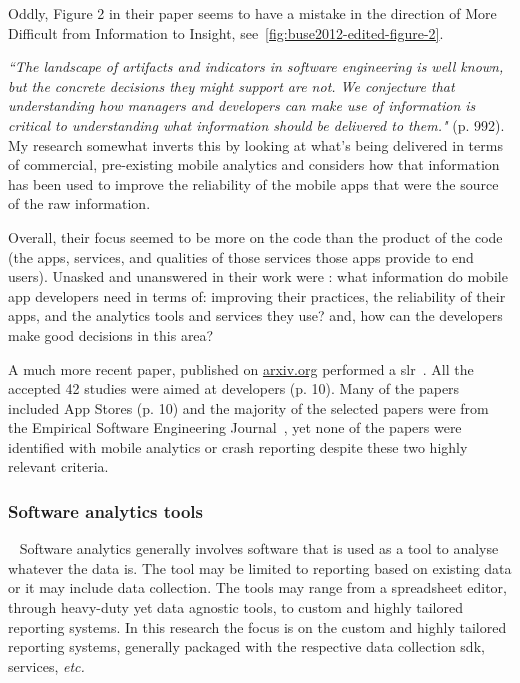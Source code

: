 Oddly, Figure 2 in their paper seems to have a mistake in the direction of More Difficult from Information to Insight, see~\ref{fig:buse2012-edited-figure-2}.

\emph{``The landscape of artifacts and indicators in software engineering is well known, but the concrete decisions they might support are not. We conjecture that understanding how managers and developers can make use of information is critical to understanding what information should be delivered to them."} (p. 992). 
My research somewhat inverts this by looking at what's being delivered in terms of commercial, pre-existing mobile analytics and considers how that information has been used to improve the reliability of the mobile apps that were the source of the raw information.

Overall, their focus seemed to be more on the code than the product of the code (the apps, services, and qualities of those services those apps provide to end users). Unasked and unanswered in their work were : what information do mobile app developers need in terms of: improving their practices, the reliability of their apps, and the analytics tools and services they use? and, how can the developers make good decisions in this area?

A much more recent paper, published on \href{https://arxiv.org/}{arxiv.org} performed a \Gls{slr}~. All the accepted 42 studies were aimed at developers (p. 10). Many of the papers included App Stores (p. 10) and the majority of the selected papers were from the Empirical Software Engineering Journal~, yet none of the papers were identified with mobile analytics or crash reporting despite these two highly relevant criteria. 


\subsubsection{Software analytics tools}~\label{rw-software-analytics-tools-research}
Software analytics generally involves software that is used as a tool to analyse whatever the data is. The tool may be limited to reporting based on existing data or it may include data collection. The tools may range from a spreadsheet editor, through heavy-duty yet data agnostic tools, to custom and highly tailored reporting systems. In this research the focus is on the custom and highly tailored reporting systems, generally packaged with the respective data collection \Gls{sdk}, services, \emph{etc.}  

